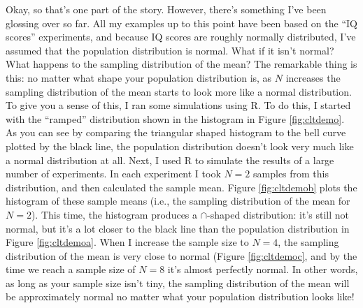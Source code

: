 \documentclass[spanish,]{book}
\begin{document}
Okay, so that's one part of the story. However, there's something I've
been glossing over so far. All my examples up to this point have been
based on the ``IQ scores'' experiments, and because IQ scores are
roughly normally distributed, I've assumed that the population
distribution is normal. What if it isn't normal? What happens to the
sampling distribution of the mean? The remarkable thing is this: no
matter what shape your population distribution is, as \(N\) increases
the sampling distribution of the mean starts to look more like a normal
distribution. To give you a sense of this, I ran some simulations using
R. To do this, I started with the ``ramped'' distribution shown in the
histogram in Figure \ref{fig:cltdemo}. As you can see by comparing the
triangular shaped histogram to the bell curve plotted by the black line,
the population distribution doesn't look very much like a normal
distribution at all. Next, I used R to simulate the results of a large
number of experiments. In each experiment I took \(N=2\) samples from
this distribution, and then calculated the sample mean. Figure
\ref{fig:cltdemob} plots the histogram of these sample means (i.e., the
sampling distribution of the mean for \(N=2\)). This time, the histogram
produces a \(\cap\)-shaped distribution: it's still not normal, but it's
a lot closer to the black line than the population distribution in
Figure \ref{fig:cltdemoa}. When I increase the sample size to \(N=4\),
the sampling distribution of the mean is very close to normal (Figure
\ref{fig:cltdemoc}, and by the time we reach a sample size of \(N=8\)
it's almost perfectly normal. In other words, as long as your sample
size isn't tiny, the sampling distribution of the mean will be
approximately normal no matter what your population distribution looks
like!
\end{document}
